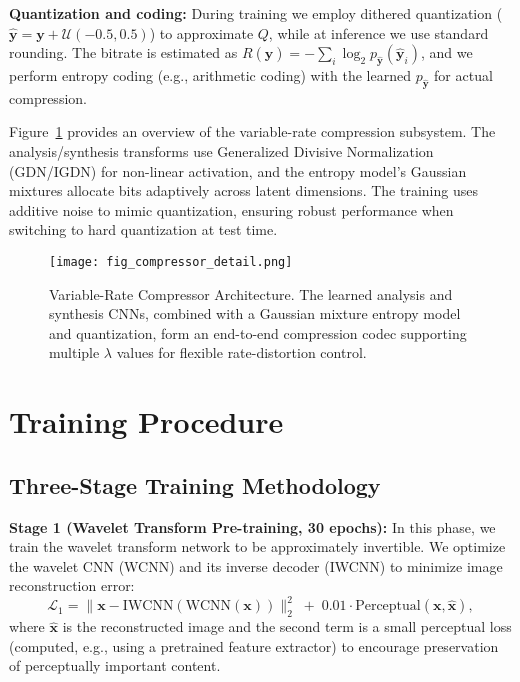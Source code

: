 \documentclass[conference]{IEEEtran}
\begin{document}
\textbf{Quantization and coding:}
During training we employ dithered quantization ($\hat{\mathbf{y}} = \mathbf{y} + \mathcal{U}(-0.5,0.5)$) to approximate $Q$, while at inference we use standard rounding. The bitrate is estimated as $R(\hat{\mathbf{y}}) = -\sum_i \log_2 p_{\hat{\mathbf{y}}}(\hat{\mathbf{y}}_i)$, and we perform entropy coding (e.g., arithmetic coding) with the learned $p_{\hat{\mathbf{y}}}$ for actual compression.

Figure~\ref{fig:compressor_detail} provides an overview of the variable-rate compression subsystem. The analysis/synthesis transforms use Generalized Divisive Normalization (GDN/IGDN) for non-linear activation, and the entropy model's Gaussian mixtures allocate bits adaptively across latent dimensions. The training uses additive noise to mimic quantization, ensuring robust performance when switching to hard quantization at test time.

\begin{figure}[htbp]
\centering
\texttt{[image: fig\_compressor\_detail.png]}
\caption{Variable-Rate Compressor Architecture. The learned analysis and synthesis CNNs, combined with a Gaussian mixture entropy model and quantization, form an end-to-end compression codec supporting multiple $\lambda$ values for flexible rate-distortion control.}
\label{fig:compressor_detail}
\end{figure}

\section{Training Procedure}

\subsection{Three-Stage Training Methodology}

\textbf{Stage 1 (Wavelet Transform Pre-training, 30 epochs):} In this phase, we train the wavelet transform network to be approximately invertible. We optimize the wavelet CNN (WCNN) and its inverse decoder (IWCNN) to minimize image reconstruction error:
\begin{equation}
\mathcal{L}_1 = \|\mathbf{x} - \text{IWCNN}(\text{WCNN}(\mathbf{x}))\|_2^2 \;+\; 0.01 \cdot \text{Perceptual}(\mathbf{x}, \hat{\mathbf{x}}),
\end{equation}
where $\hat{\mathbf{x}}$ is the reconstructed image and the second term is a small perceptual loss (computed, e.g., using a pretrained feature extractor) to encourage preservation of perceptually important content.
\end{document}
